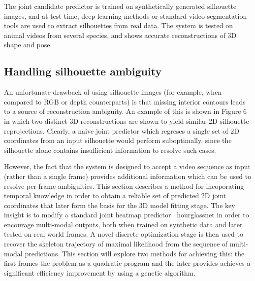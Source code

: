The joint candidate predictor is trained on synthetically generated silhouette images, and at test time, deep learning methods or standard video segmentation tools are used to extract silhouettes from real data. The system is tested on animal videos from several species, and shows accurate reconstructions of 3D shape and pose.


\subsection{Handling silhouette ambiguity}

An unfortunate drawback of using silhouette images (for example, when compared to RGB or depth counterparts) is that missing interior contours leads to a source of reconstruction ambiguity. An example of this is shown in Figure 6 in which two distinct 3D reconstructions are shown to yield similar 2D silhouette reprojections. Clearly, a naive joint predictor which regreses a single set of 2D coordinates from an input silhouette would perform suboptimally, since the silhouette alone contains insufficient information to resolve such cases. 

However, the fact that the system is designed to accept a video sequence as input (rather than a single frame) provides additional information which can be used to resolve per-frame ambiguities. This section describes a method for incoporating temporal knowledge in order to obtain a reliable set of predicted 2D joint coordinates that later form the basis for the 3D model fitting stage. The key insight is to modify a standard joint heatmap predictor~ {hourglassnet} in order to encourage multi-modal outputs, both when trained on synthetic data and later tested on real world frames. A novel discrete optimization stage is then used to recover the skeleton trajectory of maximal likelihood from the sequence of multi-modal predictions. This section will explore two methods for achieving this: the first frames the problem as a quadratic program and the later provides achieves a significant efficiency improvement by using a genetic algorithm. 





